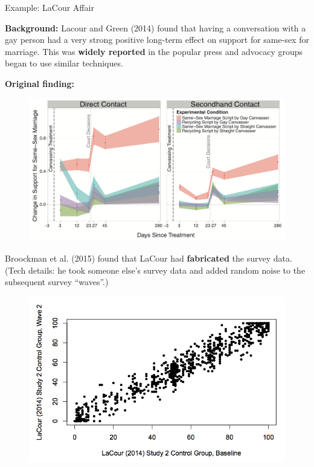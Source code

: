 \documentclass[10pt]{beamer}
\begin{document}
\begin{frame}{Example: LaCour Affair}

    \textbf{Background:} Lacour and Green (2014) found that having a conversation with a gay person had a very strong positive long-term effect on support for same-sex for marriage. This was \textbf{widely reported} in the popular press and advocacy groups began to use similar techniques.

    \textbf{Original finding:}

    \begin{figure}
        \includegraphics[scale=0.23]{img/lacour_original.png}
    \end{figure}

\end{frame}

\begin{frame}

     Broockman et al. (2015) found that LaCour had \textbf{fabricated} the survey data. (Tech details: he took someone else's survey data and added random noise to the subsequent survey ``waves''.)

     \begin{figure}
         \includegraphics[scale=0.3]{img/lacour_noise.png}
     \end{figure}

\end{frame}
\end{document}
